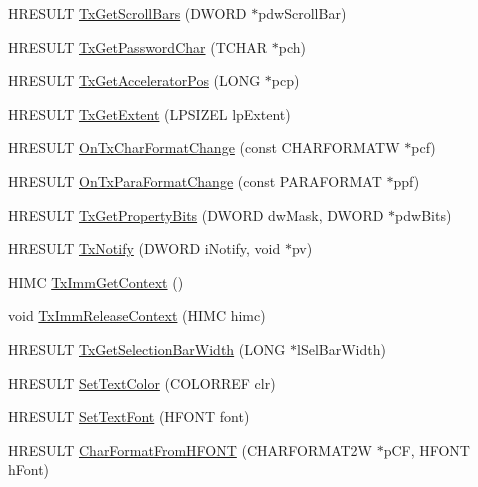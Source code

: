 \begin{DoxyCompactItemize}
\item 
H\-R\-E\-S\-U\-L\-T \hyperlink{class_c_formatted_text_draw_a0d11953e055809df98a3354a7b48eff7}{Tx\-Get\-Scroll\-Bars} (D\-W\-O\-R\-D $\ast$pdw\-Scroll\-Bar)
\item 
H\-R\-E\-S\-U\-L\-T \hyperlink{class_c_formatted_text_draw_ac64a3d02efa70493ee449dace1fea36c}{Tx\-Get\-Password\-Char} (T\-C\-H\-A\-R $\ast$pch)
\item 
H\-R\-E\-S\-U\-L\-T \hyperlink{class_c_formatted_text_draw_a45973a797c196a9d7cf02127d12e7a54}{Tx\-Get\-Accelerator\-Pos} (L\-O\-N\-G $\ast$pcp)
\item 
H\-R\-E\-S\-U\-L\-T \hyperlink{class_c_formatted_text_draw_a9247dfc9e0cce9f1942c5b6c632ed78d}{Tx\-Get\-Extent} (L\-P\-S\-I\-Z\-E\-L lp\-Extent)
\item 
H\-R\-E\-S\-U\-L\-T \hyperlink{class_c_formatted_text_draw_aa12d7dee46f52f789b6b2109008948c3}{On\-Tx\-Char\-Format\-Change} (const C\-H\-A\-R\-F\-O\-R\-M\-A\-T\-W $\ast$pcf)
\item 
H\-R\-E\-S\-U\-L\-T \hyperlink{class_c_formatted_text_draw_a01a2da9e321236594b6f3fe8bb0ac310}{On\-Tx\-Para\-Format\-Change} (const P\-A\-R\-A\-F\-O\-R\-M\-A\-T $\ast$ppf)
\item 
H\-R\-E\-S\-U\-L\-T \hyperlink{class_c_formatted_text_draw_a43579a9dbb4bd8031cdf7dd1c5a2d008}{Tx\-Get\-Property\-Bits} (D\-W\-O\-R\-D dw\-Mask, D\-W\-O\-R\-D $\ast$pdw\-Bits)
\item 
H\-R\-E\-S\-U\-L\-T \hyperlink{class_c_formatted_text_draw_a7d7aa1164fef848f8cc86084ff0d5947}{Tx\-Notify} (D\-W\-O\-R\-D i\-Notify, void $\ast$pv)
\item 
H\-I\-M\-C \hyperlink{class_c_formatted_text_draw_aeca2dd3918ef62d7f7c030f1a2add1dd}{Tx\-Imm\-Get\-Context} ()
\item 
void \hyperlink{class_c_formatted_text_draw_a677a0528e12025ac1d834ebb3fe17f4f}{Tx\-Imm\-Release\-Context} (H\-I\-M\-C himc)
\item 
H\-R\-E\-S\-U\-L\-T \hyperlink{class_c_formatted_text_draw_a26d3e8e94e5ec00f2670737ad565bb50}{Tx\-Get\-Selection\-Bar\-Width} (L\-O\-N\-G $\ast$l\-Sel\-Bar\-Width)
\item 
H\-R\-E\-S\-U\-L\-T \hyperlink{class_c_formatted_text_draw_a9ce824728f92e00b317b59d8b935d86e}{Set\-Text\-Color} (C\-O\-L\-O\-R\-R\-E\-F clr)
\item 
H\-R\-E\-S\-U\-L\-T \hyperlink{class_c_formatted_text_draw_ac3ff1149d0e0ac7da420bc71d1fc2be1}{Set\-Text\-Font} (H\-F\-O\-N\-T font)
\item 
H\-R\-E\-S\-U\-L\-T \hyperlink{class_c_formatted_text_draw_a55723aacd9eea72087f4a8c1716c44e8}{Char\-Format\-From\-H\-F\-O\-N\-T} (C\-H\-A\-R\-F\-O\-R\-M\-A\-T2\-W $\ast$p\-C\-F, H\-F\-O\-N\-T h\-Font)

\end{DoxyCompactItemize}
